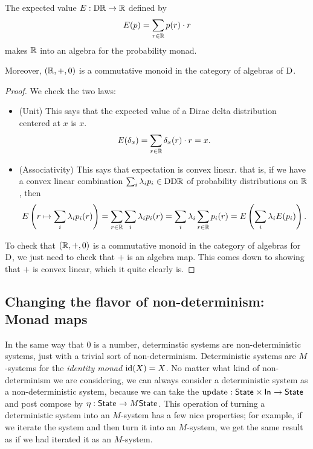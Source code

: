 \documentclass[DynamicalBook]{subfiles}
\begin{document}
\begin{proposition}
  The expected value $E : \mathrm{D} \mathbb{R} \to \mathbb{R}$ defined by
  $$E(p) = \sum_{r \in \mathbb{R}} p(r) \cdot r$$
  makes $\mathbb{R}$ into an algebra for
  the probability monad.

  Moreover, $(\mathbb{R}, +, 0)$ is a commutative monoid in the category of algebras of $\mathrm{D}$.
\end{proposition}
\begin{proof}
  We check the two laws:
  \begin{itemize}
    \item (Unit) This says that the expected value of a Dirac delta distribution
      centered at $x$ is $x$. \[
E(\delta_x) = \sum_{r \in \mathbb{R}} \delta_x(r) \cdot r = x.
\]
\item (Associativity) This says that expectation is convex linear. that is, if
  we have a convex linear combination $\sum_i \lambda_i p_i \in
  \mathrm{D}\mathrm{D} \mathbb{R}$ of probability distributions on $\mathbb{R}$, then
  \[
E\left( r \mapsto \sum_i \lambda_i p_i(r) \right) = \sum_{r \in \mathbb{R}} \sum_i \lambda_i p_i(r)
= \sum_i \lambda_i \sum_{r \in \mathbb{R}}  p_i(r) = E\left( \sum_i \lambda_i E(p_i) \right).
  \]
  \end{itemize}

  To check that $(\mathbb{R}, +, 0)$ is a commutative monoid in the category of
  algebras for $\mathrm{D}$, we just need to check that $+$ is an algebra map.
  This comes down to showing that $+$ is convex linear, which it quite clearly is.
\end{proof}

\fi



\subsection{Changing the flavor of non-determinism: Monad maps}

In the same way that $0$ is a number, determinstic systems are 
non-deterministic systems, just with a trivial sort of non-determinism. Deterministic systems are $M$-systems for the
\emph{identity monad} $\mathrm{id}(X) = X$. No matter what kind of non-determinism we
are considering, we can always consider a deterministic system as a
non-deterministic system, because we can take the $\mathrm{update}_{\mathsf{}}: \mathsf{State}_{\mathsf{}} \times
\mathsf{In}_{\mathsf{}} \to \mathsf{State}_{\mathsf{}}$ and post compose by $\eta : \mathsf{State}_{\mathsf{}} \to M\mathsf{State}_{\mathsf{}}$. This
operation of turning a deterministic system into an $M$-system has a few nice
properties; for example, if we iterate the system and then turn it into an
$M$-system, we get the same result as if we had iterated it as an $M$-system.
\end{document}
